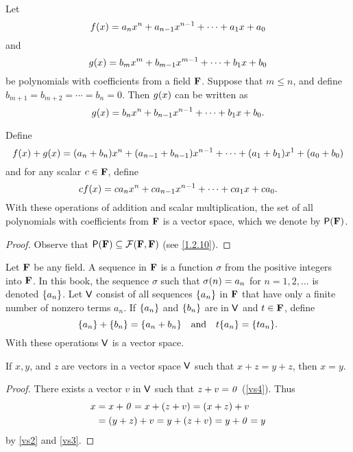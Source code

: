 \begin{eg}\label{1.2.12}
  Let
  \[
    f\p{x} = a_{n} x^{n} + a_{n - 1} x^{n - 1} + \cdots + a_{1} x + a_{0}
  \]
  and
  \[
    g\p{x} = b_{m} x^{m} + b_{m - 1} x^{m - 1} + \cdots + b_{1} x + b_{0}
  \]
  be polynomials with coefficients from a field \(\mathbf{F}\).
  Suppose that \(m \leq n\), and define \(b_{m + 1} = b_{m + 2} = \cdots = b_{n} = 0\).
  Then \(g\p{x}\) can be written as
  \[
    g\p{x} = b_{n} x^{n} + b_{n - 1} x^{n - 1} + \cdots + b_{1} x + b_{0}.
  \]

  Define
  \[
    f\p{x} + g\p{x} = \p{a_{n} + b_{n}} x^{n} + \p{a_{n - 1} + b_{n - 1}} x^{n - 1} + \cdots + \p{a_{1} + b_{1}} x^{1} + \p{a_{0} + b_{0}}
  \]
  and for any scalar \(c \in \mathbf{F}\), define
  \[
    cf\p{x} = ca_{n} x^{n} + ca_{n - 1} x^{n - 1} + \cdots + ca_{1} x + ca_{0}.
  \]
  With these operations of addition and scalar multiplication, the set of all polynomials with coefficients from \(\mathbf{F}\) is a vector space, which we denote by \(\ps{\F}\).
\end{eg}

\begin{proof}
  Observe that \(\ps{\F} \subseteq \fs{\F}{\F}\) (see \cref{1.2.10}).
\end{proof}

\begin{eg}\label{1.2.13}
  Let \(\mathbf{F}\) be any field.
  A sequence in \(\mathbf{F}\) is a function \(\sigma\) from the positive integers into \(\mathbf{F}\).
  In this book, the sequence \(\sigma\) such that \(\sigma\p{n} = a_{n}\) for \(n = 1, 2, \dots\) is denoted \(\left\lbrace a_{n}\right\rbrace\).
  Let \(\mathsf{V}\) consist of all sequences \(\left\lbrace a_{n}\right\rbrace\) in \(\mathbf{F}\) that have only a finite number of nonzero terms \(a_{n}\).
  If \(\left\lbrace a_{n}\right\rbrace\) and \(\left\lbrace b_{n}\right\rbrace\) are in \(\mathsf{V}\) and \(t \in \mathbf{F}\), define
  \[
    \set{a_{n}} + \set{b_{n}} = \set{a_{n} + b_{n}} \quad \text{and} \quad t\set{a_{n}} = \set{ta_{n}}.
  \]
  With these operations \(\mathsf{V}\) is a vector space.
\end{eg}

\begin{thm}\label{1.2.14}
  If \(x, y\), and \(z\) are vectors in a vector space \(\mathsf{V}\) such that \(x + z = y + z\), then \(x = y\).
\end{thm}

\begin{proof}
  There exists a vector \(v\) in \(\mathsf{V}\) such that \(z + v = \mathit{0}\) (\ref{vs4}).
  Thus
  \begin{align*}
    x & = x + \mathit{0} = x + \left\lparen z + v\right\rparen = \left\lparen x + z\right\rparen + v     \\
      & = \left\lparen y + z\right\rparen + v = y + \left\lparen z + v\right\rparen = y + \mathit{0} = y
  \end{align*}
  by \ref{vs2} and \ref{vs3}.
\end{proof}

